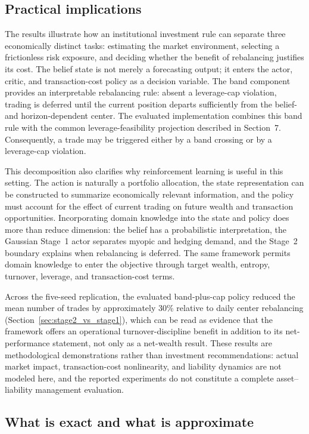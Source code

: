 \documentclass[a4paper,10pt]{article}
\begin{document}
\subsection{Practical implications}

The results illustrate how an institutional investment rule can separate three economically distinct tasks: estimating the market environment, selecting a frictionless risk exposure, and deciding whether the benefit of rebalancing justifies its cost. The belief state is not merely a forecasting output; it enters the actor, critic, and transaction-cost policy as a decision variable. The band component provides an interpretable rebalancing rule:
absent a leverage-cap violation, trading is deferred until the current
position departs sufficiently from the belief- and horizon-dependent center.
The evaluated implementation combines this band rule with the common
leverage-feasibility projection described in Section~7. Consequently, a trade
may be triggered either by a band crossing or by a leverage-cap violation.

This decomposition also clarifies why reinforcement learning is useful in this setting. The action is naturally a portfolio allocation, the state representation can be constructed to summarize economically relevant information, and the policy must account for the effect of current trading on future wealth and transaction opportunities. Incorporating domain knowledge into the state and policy does more than reduce dimension: the belief has a probabilistic interpretation, the Gaussian Stage~1 actor separates myopic and hedging demand, and the Stage~2 boundary explains when rebalancing is deferred. The same framework permits domain knowledge to enter the objective through target wealth, entropy, turnover, leverage, and transaction-cost terms.

Across the five-seed replication, the evaluated band-plus-cap policy reduced the mean number of trades by approximately 30\% relative to daily center rebalancing (Section~\ref{sec:stage2_vs_stage1}), which can be read as evidence that the framework offers an operational turnover-discipline benefit in addition to its net-performance statement, not only as a net-wealth result. These results are methodological demonstrations rather than investment recommendations: actual market impact, transaction-cost nonlinearity, and liability dynamics are not modeled here, and the reported experiments do not constitute a complete asset--liability management evaluation.

\subsection{What is exact and what is approximate}
\end{document}
